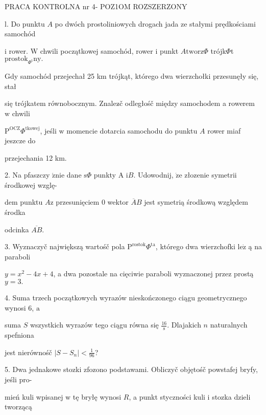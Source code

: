 \documentclass[a4paper,12pt]{article}
\begin{document}
PRACA KONTROLNA nr 4- POZ1OM ROZSZERZONY

l. Do punktu $A$ po dwóch prostoliniowych drogach jada ze stałymi prędkościami samochód

$\mathrm{i}$ rower. $\mathrm{W}$ chwili początkowej samochód, rower $\mathrm{i}$ punkt $ A\mathrm{t}\mathrm{w}\mathrm{o}\mathrm{r}\mathrm{z}\Phi$ trójk$\Phi$t $\mathrm{p}\mathrm{r}\mathrm{o}\mathrm{s}\mathrm{t}\mathrm{o}\mathrm{k}_{\Phi^{\mathrm{t}}}\mathrm{n}\mathrm{y}.$

Gdy samochód przejechał 25 km trójkąt, którego dwa wierzchołki przesunęły się, stał

się trójkatem równobocznym. Znalez$\acute{}$č odległośč między samochodem a rowerem $\mathrm{w}$ chwili

$\mathrm{P}^{\mathrm{O}\mathrm{C}\mathrm{Z}}\Phi^{\mathrm{t}\mathrm{k}\mathrm{o}\mathrm{w}\mathrm{e}\mathrm{j}}$, jeśli $\mathrm{w}$ momencie dotarcia samochodu do punktu $A$ rower miaf jeszcze do

przejechania 12 km.

2. Na pfaszczy $\acute{\mathrm{z}}\mathrm{n}\mathrm{i}\mathrm{e}$ dane $\mathrm{s}\Phi$ punkty A $\mathrm{i}B$. Udowodnij, $\dot{\mathrm{z}}\mathrm{e}$ złozenie symetrii środkowej wzglę-

dem punktu $A\mathrm{z}$ przesunięciem $0$ wektor $\overline{A}B$ jest symetrią środkową względem środka

odcinka $\overline{AB}.$

3. Wyznaczyč największą wartośč pola $\mathrm{P}^{\mathrm{r}\mathrm{o}\mathrm{s}\mathrm{t}\mathrm{o}\mathrm{k}}\Phi^{\mathrm{t}\mathrm{a}}$, którego dwa wierzchofki $\mathrm{l}\mathrm{e}\dot{\mathrm{z}}$ ą na paraboli

$y=x^{2}-4x+4$, a dwa pozostale na cięciwie paraboli wyznaczonej przez prostą $y=3.$

4. Suma trzech początkowych wyrazów nieskończonego ciągu geometrycznego wynosi 6, $\mathrm{a}$

suma $S$ wszystkich wyrazów tego ciągu równa się $\displaystyle \frac{16}{\mathrm{s}}$. Dlajakich $n$ naturalnych spefniona

jest nierównośč $|S-S_{n}|<\displaystyle \frac{1}{96}$?

5. Dwa jednakowe stozki zfozono podstawami. Obliczyč objętośč powstafej bryfy, jeśli pro-

mień kuli wpisanej $\mathrm{w}$ tę bryłę wynosi $R$, a punkt styczności kuli $\mathrm{i}$ stozka dzieli tworzącą
\end{document}

